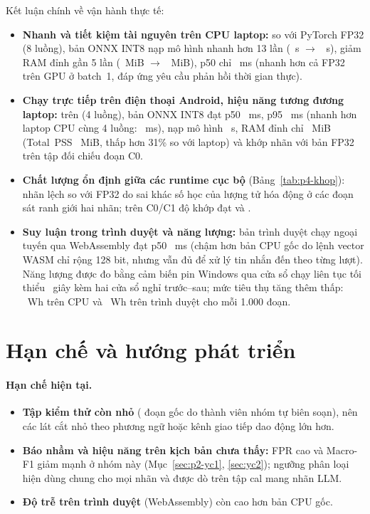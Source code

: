 Kết luận chính về vận hành thực tế:
\begin{itemize}
  \item \textbf{Nhanh và tiết kiệm tài nguyên trên CPU laptop:} so với PyTorch FP32 (8 luồng), bản ONNX INT8 nạp mô
        hình nhanh hơn 13 lần (~s $\to$ ~s), giảm RAM đỉnh gần
        5 lần (~MiB $\to$ ~MiB), p50 chỉ ~ms
        (nhanh hơn cả FP32 trên GPU  ở batch~1, đáp ứng yêu cầu phản hồi thời gian thực).
  \item \textbf{Chạy trực tiếp trên điện thoại Android, hiệu năng tương đương laptop:} trên  (4
        luồng), bản ONNX INT8 đạt p50 ~ms, p95 ~ms (nhanh hơn laptop CPU cùng
        4 luồng: ~ms), nạp mô hình ~s, RAM đỉnh chỉ
        ~MiB (Total~PSS ~MiB, thấp hơn 31\% so với laptop) và khớp nhãn
         với bản FP32 trên tập đối chiếu  đoạn C0.
  \item \textbf{Chất lượng ổn định giữa các runtime cục bộ} (Bảng~\ref{tab:p4-khop}): nhãn lệch so với FP32 do sai
        khác số học của lượng tử hóa động ở các đoạn sát ranh giới hai nhãn; trên C0/C1 độ khớp đạt
         và .
  \item \textbf{Suy luận trong trình duyệt và năng lượng:} bản trình duyệt chạy ngoại tuyến qua
        WebAssembly đạt p50 ~ms (chậm hơn bản CPU gốc do lệnh vector WASM chỉ rộng 128 bit, nhưng vẫn
        đủ để xử lý tin nhắn đến theo từng lượt). Năng lượng được đo bằng cảm biến pin Windows qua cửa sổ
        chạy liên tục tối thiểu ~giây kèm hai cửa sổ nghỉ trước--sau; mức tiêu thụ tăng thêm
        thấp: ~Wh trên CPU và ~Wh trên trình duyệt cho mỗi 1.000 đoạn.
\end{itemize}

\section{Hạn chế và hướng phát triển}
\label{sec:han-che}

\paragraph{Hạn chế hiện tại.}
\begin{itemize}
  \item \textbf{Tập kiểm thử còn nhỏ} ( đoạn gốc do thành viên nhóm tự biên soạn), nên các
        lát cắt nhỏ theo phương ngữ hoặc kênh giao tiếp dao động lớn hơn.
  \item \textbf{Báo nhầm và hiệu năng trên kịch bản chưa thấy:} FPR cao và Macro-F1 giảm mạnh ở nhóm này
        (Mục~\ref{sec:p2-yc1}, \ref{sec:yc2}); ngưỡng phân loại hiện dùng chung cho mọi nhãn và được dò trên tập cal
        mang nhãn LLM.
  \item \textbf{Độ trễ trên trình duyệt} (WebAssembly) còn cao hơn bản CPU gốc.
\end{itemize}

